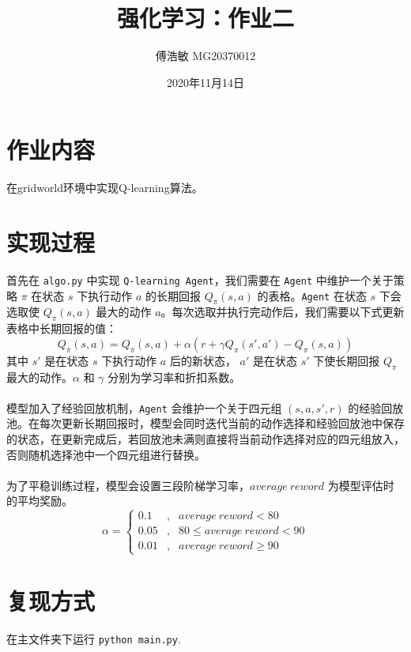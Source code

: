 \documentclass[a4paper,12pt]{article}
\begin{document}
\begin{CJK}{UTF8}{gbsn}

\title{强化学习：作业二}

\author{傅浩敏 MG20370012}

\date{2020年11月14日}

\maketitle

\section{作业内容}
在gridworld环境中实现Q-learning算法。

\section{实现过程}
首先在 \texttt{algo.py} 中实现 \texttt{Q-learning Agent}，我们需要在 \texttt{Agent} 中维护一个关于策略 $\pi$ 在状态 $s$ 下执行动作 $a$ 的长期回报 $Q_\pi(s,a)$ 的表格。\texttt{Agent} 在状态 $s$ 下会选取使 $Q_\pi(s,a)$ 最大的动作 $a$。每次选取并执行完动作后，我们需要以下式更新表格中长期回报的值：
$$Q_\pi(s,a)=Q_\pi(s,a)+\alpha(r+\gamma Q_\pi(s',a')-Q_\pi(s,a))$$
其中 $s'$ 是在状态 $s$ 下执行动作 $a$ 后的新状态， $a'$ 是在状态 $s'$ 下使长期回报 $Q_\pi$ 最大的动作。$\alpha$ 和 $\gamma$ 分别为学习率和折扣系数。\\\\
模型加入了经验回放机制，\texttt{Agent} 会维护一个关于四元组 $(s,a,s',r)$ 的经验回放池。在每次更新长期回报时，模型会同时迭代当前的动作选择和经验回放池中保存的状态，在更新完成后，若回放池未满则直接将当前动作选择对应的四元组放入，否则随机选择池中一个四元组进行替换。\\\\
为了平稳训练过程，模型会设置三段阶梯学习率，$average\ reword$ 为模型评估时的平均奖励。
$$\alpha=\left\{\begin{aligned}
0.1 &,& average\ reword<80 \\
0.05 &,& 80\leq average\ reword<90 \\
0.01 &,& average\ reword\geq 90
\end{aligned}\right.$$
\section{复现方式}
在主文件夹下运行 \texttt{python main.py}.

\end{CJK}
\end{document}
